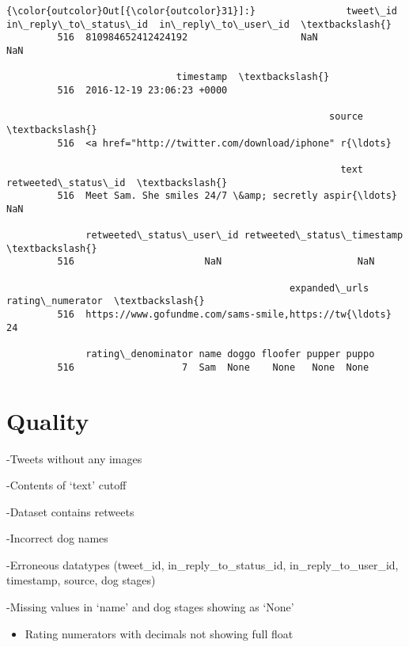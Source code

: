 \documentclass[11pt]{article}
\providecommand{\tightlist}{%
      \setlength{\itemsep}{0pt}\setlength{\parskip}{0pt}}
\begin{document}
\begin{Verbatim}[commandchars=\\\{\}]
{\color{outcolor}Out[{\color{outcolor}31}]:}                tweet\_id  in\_reply\_to\_status\_id  in\_reply\_to\_user\_id  \textbackslash{}
         516  810984652412424192                    NaN                  NaN   
         
                              timestamp  \textbackslash{}
         516  2016-12-19 23:06:23 +0000   
         
                                                         source  \textbackslash{}
         516  <a href="http://twitter.com/download/iphone" r{\ldots}   
         
                                                           text  retweeted\_status\_id  \textbackslash{}
         516  Meet Sam. She smiles 24/7 \&amp; secretly aspir{\ldots}                  NaN   
         
              retweeted\_status\_user\_id retweeted\_status\_timestamp  \textbackslash{}
         516                       NaN                        NaN   
         
                                                  expanded\_urls  rating\_numerator  \textbackslash{}
         516  https://www.gofundme.com/sams-smile,https://tw{\ldots}                24   
         
              rating\_denominator name doggo floofer pupper puppo  
         516                   7  Sam  None    None   None  None  
\end{Verbatim}
            
    \hypertarget{quality}{%
\section{Quality}\label{quality}}

    -Tweets without any images

-Contents of `text' cutoff

-Dataset contains retweets

-Incorrect dog names

-Erroneous datatypes (tweet\_id, in\_reply\_to\_status\_id,
in\_reply\_to\_user\_id, timestamp, source, dog stages)

-Missing values in `name' and dog stages showing as `None'

\begin{itemize}
\tightlist
\item
  Rating numerators with decimals not showing full float
\end{itemize}
\end{document}
